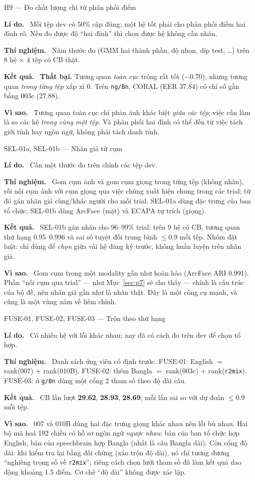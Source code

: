 \documentclass[11pt,a4paper,oneside]{report}
\newcommand{\up}[1]{\textbf{\color{good}#1}}
\newcommand{\down}[1]{\textbf{\color{bad}#1}}
\newcommand{\id}[1]{\texttt{#1}}
\newcommand{\field}[1]{\par\smallskip\textbf{\color{accent}#1.}~}
\begin{document}
\begin{expbox}{H9 --- Đo chất lượng chỉ từ phân phối điểm}
\field{Lí do} Mỗi tệp dev có 50\% cặp đúng; một hệ tốt phải cho phân phối điểm hai đỉnh rõ. Nếu đo được độ ``hai đỉnh'' thì chọn được hệ không cần nhãn.
\field{Thí nghiệm} Năm thước đo (GMM hai thành phần, độ nhọn, dip test, \dots) trên 8 hệ $\times$ 4 tệp có CB thật.
\field{Kết quả} \down{Thất bại.} Tương quan \emph{toàn cục} trông rất tốt ($-0.70$), nhưng tương quan \emph{trong từng tệp} xấp xỉ 0. Trên \id{ng/Bn}, CORAL (EER 37.84) có chỉ số gần bằng 003c (27.88).
\field{Vì sao} Tương quan toàn cục chỉ phản ánh khác biệt \emph{giữa các tệp}; việc cần làm là so các hệ \emph{trong cùng một tệp}. Và phân phối hai đỉnh có thể đến từ việc tách giới tính hay ngôn ngữ, không phải tách danh tính.
\end{expbox}

\begin{expbox}{SEL-01a, SEL-01b --- Nhãn giả từ cụm}
\field{Lí do} Cần một thước đo trên chính các tệp dev.
\field{Thí nghiệm} Gom cụm ảnh và gom cụm giọng trong từng tệp (không nhãn), rồi nối cụm ảnh với cụm giọng qua việc chúng xuất hiện chung trong các trial; từ đó gán nhãn giả cùng/khác người cho mỗi trial. SEL-01a dùng đặc trưng của ban tổ chức; SEL-01b dùng ArcFace (mặt) và ECAPA tự trích (giọng).
\field{Kết quả} SEL-01b gán nhãn cho 96--99\% trial; trên 9 hệ có CB, tương quan thứ hạng 0.95--0.996 và sai số tuyệt đối trung bình $\le0.9$ mỗi tệp. Nhóm đặt luật: chỉ dùng để \emph{chọn} giữa vài hệ đăng ký trước, không huấn luyện trên nhãn giả.
\field{Vì sao} Gom cụm trong một modality gần như hoàn hảo (ArcFace ARI 0.991). Phần ``nối cụm qua trial'' --- như Mục~\ref{sec:p7} sẽ cho thấy --- chính là cấu trúc của bộ đề, nên nhãn giả gần như là nhãn thật. Đây là một công cụ mạnh, và cũng là một vùng xám về liêm chính.
\end{expbox}

\begin{expbox}{FUSE-01, FUSE-02, FUSE-03 --- Trộn theo thứ hạng}
\field{Lí do} Có nhiều hệ với lỗi khác nhau; nay đã có cách đo trên dev để chọn tổ hợp.
\field{Thí nghiệm} Danh sách ứng viên cố định trước. FUSE-01: English $=$ rank(007) $+$ rank(010B). FUSE-02: thêm Bangla $=$ rank(003c) $+$ rank(\id{r2mix}). FUSE-03: ở \id{g/Bn} dùng một cổng 2 tham số theo độ dài câu.
\field{Kết quả} CB lần lượt \up{29.62}, \up{28.93}, \up{28.69}; mỗi lần sai so với dự đoán $\le0.9$ mỗi tệp.
\field{Vì sao} 007 và 010B dùng hai đặc trưng giọng khác nhau nên lỗi bù nhau. Hai bộ mã hoá 192 chiều có hồ sơ ngôn ngữ \emph{ngược nhau}: bản của ban tổ chức hợp English, bản của speechbrain hợp Bangla (nhất là câu Bangla dài). Còn cổng độ dài: khi kiểm tra lại bằng đối chứng (xáo trộn độ dài), nó chỉ tương đương ``nghiêng trọng số về \id{r2mix}''; riêng cách chọn lưới tham số đã làm kết quả dao động khoảng 1.5 điểm. Cơ chế ``độ dài'' không được xác lập.
\end{expbox}
\end{document}
